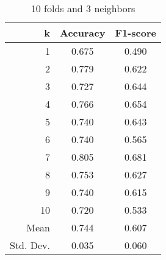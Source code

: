 \begin{table}
\centering
\caption{10 folds and 3 neighbors}
\begin{tabular}{rcc}
\toprule
         k &  Accuracy &  F1-score \\
\midrule
         1 &     0.675 &     0.490 \\
         2 &     0.779 &     0.622 \\
         3 &     0.727 &     0.644 \\
         4 &     0.766 &     0.654 \\
         5 &     0.740 &     0.643 \\
         6 &     0.740 &     0.565 \\
         7 &     0.805 &     0.681 \\
         8 &     0.753 &     0.627 \\
         9 &     0.740 &     0.615 \\
        10 &     0.720 &     0.533 \\
      Mean &     0.744 &     0.607 \\
 Std. Dev. &     0.035 &     0.060 \\
\bottomrule
\end{tabular}
\end{table}
